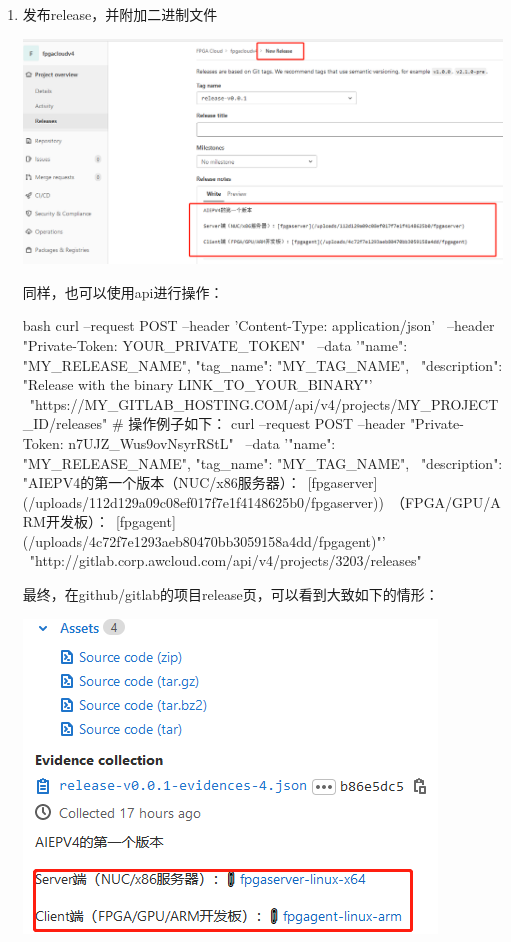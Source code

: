 \begin{enumerate}
  \item 发布release，并附加二进制文件

\par\begin{minipage}{\linewidth}
\centering
\includegraphics[width=\linewidth]{gitrelease.png}
\label{fig:gitrelease}
\end{minipage}
同样，也可以使用api进行操作：
\begin{code-block}{bash}
curl --request POST --header 'Content-Type: application/json' \
    --header "Private-Token: YOUR_PRIVATE_TOKEN" \
    --data '{"name": "MY_RELEASE_NAME", "tag_name": "MY_TAG_NAME", \
             "description": "Release with the binary LINK_TO_YOUR_BINARY"}' \
    "https://MY_GITLAB_HOSTING.COM/api/v4/projects/MY_PROJECT_ID/releases"
# 操作例子如下：
curl --request POST --header "Private-Token: n7UJZ_Wus9ovNsyrRStL" \
    --data '{"name": "MY_RELEASE_NAME", "tag_name": "MY_TAG_NAME", \
    "description": "AIEPV4的第一个版本\n{}（NUC/x86服务器）：\
    [fpgaserver](/uploads/112d129a09c08ef017f7e1f4148625b0/fpgaserver))\
    \n{}（FPGA/GPU/ARM开发板）：\
    [fpgagent](/uploads/4c72f7e1293aeb80470bb3059158a4dd/fpgagent)"}' \
    "http://gitlab.corp.awcloud.com/api/v4/projects/3203/releases"
\end{code-block}
最终，在github/gitlab的项目release页，可以看到大致如下的情形：
\par\begin{minipage}{\linewidth}
\centering
\includegraphics[scale=0.8]{release_bin.png}
\captionof{figure}{release版本}
\label{fig:release_bin}
\end{minipage}
\end{enumerate}

